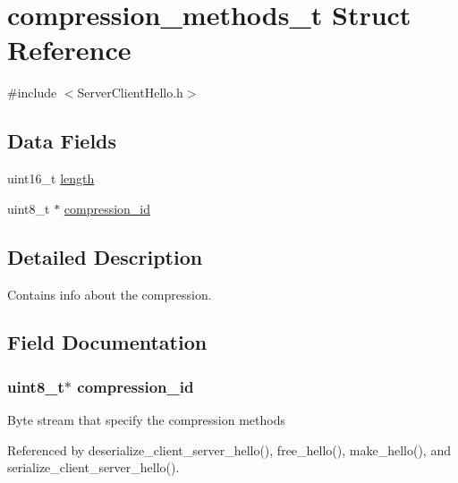 \hypertarget{structcompression__methods__t}{}\section{compression\+\_\+methods\+\_\+t Struct Reference}
\label{structcompression__methods__t}


{\ttfamily \#include $<$Server\+Client\+Hello.\+h$>$}

\subsection*{Data Fields}
\begin{DoxyCompactItemize}
\item 
uint16\+\_\+t \hyperlink{structcompression__methods__t_a1892eba2086d12ac2b09005aeb09ea3b}{length}
\item 
uint8\+\_\+t $\ast$ \hyperlink{structcompression__methods__t_a2c3e9fd1dd8d353e427fce404df23633}{compression\+\_\+id}
\end{DoxyCompactItemize}


\subsection{Detailed Description}
Contains info about the compression. 

\subsection{Field Documentation}
\subsubsection[{\texorpdfstring{compression\+\_\+id}{compression_id}}]{\setlength{\rightskip}{0pt plus 5cm}uint8\+\_\+t$\ast$ compression\+\_\+id}\hypertarget{structcompression__methods__t_a2c3e9fd1dd8d353e427fce404df23633}{}\label{structcompression__methods__t_a2c3e9fd1dd8d353e427fce404df23633}
Byte stream that specify the compression methods 

Referenced by deserialize\+\_\+client\+\_\+server\+\_\+hello(), free\+\_\+hello(), make\+\_\+hello(), and serialize\+\_\+client\+\_\+server\+\_\+hello().

